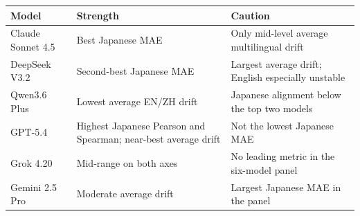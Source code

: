 \begin{tabular}{@{}p{}p{}p{}@{}}
\toprule
Model & Strength & Caution \\
\midrule
Claude Sonnet 4.5 & Best Japanese MAE & Only mid-level average multilingual drift \\
DeepSeek V3.2 & Second-best Japanese MAE & Largest average drift; English especially unstable \\
Qwen3.6 Plus & Lowest average EN/ZH drift & Japanese alignment below the top two models \\
GPT-5.4 & Highest Japanese Pearson and Spearman; near-best average drift & Not the lowest Japanese MAE \\
Grok 4.20 & Mid-range on both axes & No leading metric in the six-model panel \\
Gemini 2.5 Pro & Moderate average drift & Largest Japanese MAE in the panel \\
\bottomrule
\end{tabular}